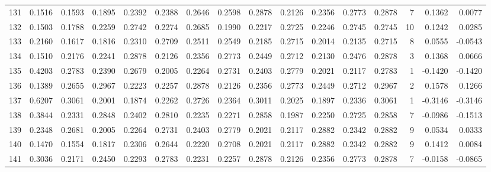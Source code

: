 \begin{tabular}{lrrrrrrrrrrrrrrr}
131 &      0.1516 &  0.1593 &  0.1895 &  0.2392 &  0.2388 &  0.2646 &  0.2598 &  0.2878 &  0.2126 &  0.2356 &   0.2773 &     0.2878 &      7 &                    0.1362 &                     0.0077 \\
132 &      0.1503 &  0.1788 &  0.2259 &  0.2742 &  0.2274 &  0.2685 &  0.1990 &  0.2217 &  0.2725 &  0.2246 &   0.2745 &     0.2745 &     10 &                    0.1242 &                     0.0285 \\
133 &      0.2160 &  0.1617 &  0.1816 &  0.2310 &  0.2709 &  0.2511 &  0.2549 &  0.2185 &  0.2715 &  0.2014 &   0.2135 &     0.2715 &      8 &                    0.0555 &                    -0.0543 \\
134 &      0.1510 &  0.2176 &  0.2241 &  0.2878 &  0.2126 &  0.2356 &  0.2773 &  0.2449 &  0.2712 &  0.2130 &   0.2476 &     0.2878 &      3 &                    0.1368 &                     0.0666 \\
135 &      0.4203 &  0.2783 &  0.2390 &  0.2679 &  0.2005 &  0.2264 &  0.2731 &  0.2403 &  0.2779 &  0.2021 &   0.2117 &     0.2783 &      1 &                   -0.1420 &                    -0.1420 \\
136 &      0.1389 &  0.2655 &  0.2967 &  0.2223 &  0.2257 &  0.2878 &  0.2126 &  0.2356 &  0.2773 &  0.2449 &   0.2712 &     0.2967 &      2 &                    0.1578 &                     0.1266 \\
137 &      0.6207 &  0.3061 &  0.2001 &  0.1874 &  0.2262 &  0.2726 &  0.2364 &  0.3011 &  0.2025 &  0.1897 &   0.2336 &     0.3061 &      1 &                   -0.3146 &                    -0.3146 \\
138 &      0.3844 &  0.2331 &  0.2848 &  0.2402 &  0.2810 &  0.2235 &  0.2271 &  0.2858 &  0.1987 &  0.2250 &   0.2725 &     0.2858 &      7 &                   -0.0986 &                    -0.1513 \\
139 &      0.2348 &  0.2681 &  0.2005 &  0.2264 &  0.2731 &  0.2403 &  0.2779 &  0.2021 &  0.2117 &  0.2882 &   0.2342 &     0.2882 &      9 &                    0.0534 &                     0.0333 \\
140 &      0.1470 &  0.1554 &  0.1817 &  0.2306 &  0.2644 &  0.2220 &  0.2708 &  0.2021 &  0.2117 &  0.2882 &   0.2342 &     0.2882 &      9 &                    0.1412 &                     0.0084 \\
141 &      0.3036 &  0.2171 &  0.2450 &  0.2293 &  0.2783 &  0.2231 &  0.2257 &  0.2878 &  0.2126 &  0.2356 &   0.2773 &     0.2878 &      7 &                   -0.0158 &                    -0.0865 \\

\end{tabular}
